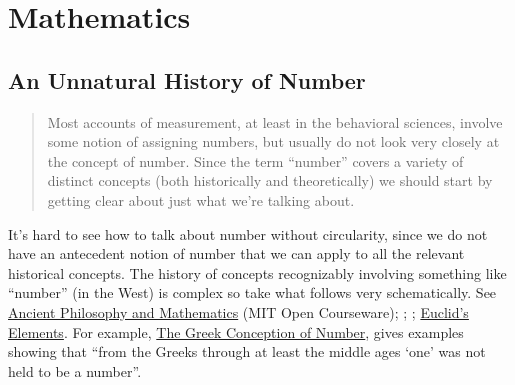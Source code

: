 \documentclass[11pt,twoside]{article}
\begin{document}
\section{Mathematics}
\subsection{An Unnatural History of Number}

\begin{abstract}
  Most accounts of measurement, at least in the behavioral sciences,
  involve some notion of assigning numbers, but usually do not look
  very closely at the concept of number.  Since the term ``number''
  covers a variety of distinct concepts (both historically and
  theoretically) we should start by getting clear about just what
  we're talking about.
\end{abstract}

It's hard to see how to talk about number without circularity, since
we do not have an antecedent notion of number that we can apply to all
the relevant historical concepts.  The history of concepts
recognizably involving something like ``number'' (in the West) is
complex so take what follows very schematically.  See
\href{http://ocw.mit.edu/courses/special-programs/sp-2h3-ancient-philosophy-and-mathematics-fall-2009/}{Ancient
  Philosophy and Mathematics} (MIT Open Courseware);
\cite{hoyrup_lengths_2002}; \cite{grattan-guinness_numbers_1996};
\href{http://aleph0.clarku.edu/~djoyce/java/elements/}{Euclid's Elements}. For
example,
\href{http://ocw.mit.edu/courses/special-programs/sp-2h3-ancient-philosophy-and-mathematics-fall-2009/assignments/MITSP\_2H3F09\_ses5.pdf}{The
  Greek Conception of Number}, gives examples showing that ``from the
Greeks through at least the middle ages `one' was not held to be a
number''.
\end{document}
